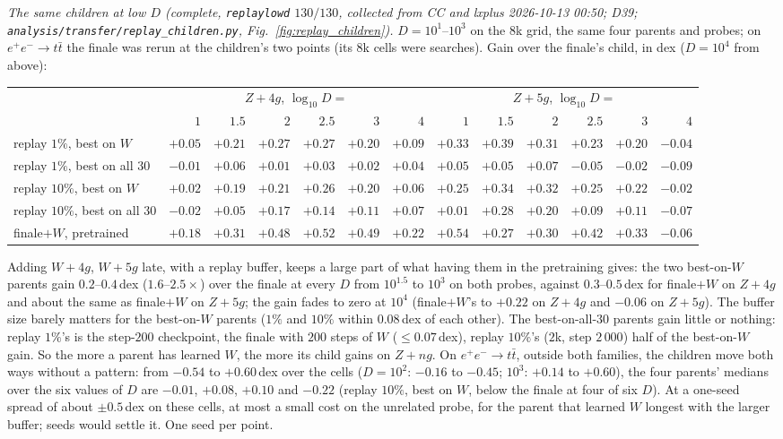 \documentclass[11pt]{article}
\newcommand{\code}[1]{\texttt{#1}}
\begin{document}
\emph{The same children at low $D$ (complete, \code{replaylowd} $130/130$, collected from CC and lxplus 2026-10-13
00:50; D39; \code{analysis/transfer/replay\_children.py}, Fig.~\ref{fig:replay_children}).} $D=10^1$--$10^3$ on the $8$k
grid, the same four parents and probes; on $e^+e^-\to t\bar t$ the finale was rerun at the children's two points (its $8$k
cells were searches). Gain over the finale's child, in dex ($D=10^4$ from above):
\begin{center}\small
\begin{tabular}{l rrrrrr rrrrrr}
 & \multicolumn{6}{c}{$Z+4g$, $\log_{10}D=$} & \multicolumn{6}{c}{$Z+5g$, $\log_{10}D=$} \\
 & $1$ & $1.5$ & $2$ & $2.5$ & $3$ & $4$ & $1$ & $1.5$ & $2$ & $2.5$ & $3$ & $4$ \\ \hline
replay $1\%$, best on $W$     & $+0.05$ & $+0.21$ & $+0.27$ & $+0.27$ & $+0.20$ & $+0.09$ & $+0.33$ & $+0.39$ & $+0.31$ & $+0.23$ & $+0.20$ & $-0.04$ \\
replay $1\%$, best on all $30$ & $-0.01$ & $+0.06$ & $+0.01$ & $+0.03$ & $+0.02$ & $+0.04$ & $+0.05$ & $+0.05$ & $+0.07$ & $-0.05$ & $-0.02$ & $-0.09$ \\
replay $10\%$, best on $W$    & $+0.02$ & $+0.19$ & $+0.21$ & $+0.26$ & $+0.20$ & $+0.06$ & $+0.25$ & $+0.34$ & $+0.32$ & $+0.25$ & $+0.22$ & $-0.02$ \\
replay $10\%$, best on all $30$ & $-0.02$ & $+0.05$ & $+0.17$ & $+0.14$ & $+0.11$ & $+0.07$ & $+0.01$ & $+0.28$ & $+0.20$ & $+0.09$ & $+0.11$ & $-0.07$ \\ \hline
finale$+W$, pretrained        & $+0.18$ & $+0.31$ & $+0.48$ & $+0.52$ & $+0.49$ & $+0.22$ & $+0.54$ & $+0.27$ & $+0.30$ & $+0.42$ & $+0.33$ & $-0.06$ \\
\end{tabular}
\end{center}
Adding $W+4g$, $W+5g$ late, with a replay buffer, keeps a large part of what having them in the pretraining gives: the
two best-on-$W$ parents gain $0.2$--$0.4$\,dex ($1.6$--$2.5\times$) over the finale at every $D$ from $10^{1.5}$ to
$10^3$ on both probes, against $0.3$--$0.5$\,dex for finale$+W$ on $Z+4g$ and about the same as finale$+W$ on $Z+5g$; the
gain fades to zero at $10^4$ (finale$+W$'s to $+0.22$ on $Z+4g$ and $-0.06$ on $Z+5g$). The buffer size barely matters for
the best-on-$W$ parents ($1\%$ and $10\%$ within $0.08$\,dex of each other). The best-on-all-$30$ parents gain little or nothing: replay $1\%$'s is the step-$200$
checkpoint, the finale with $200$ steps of $W$ ($\le0.07$\,dex), replay $10\%$'s ($2$k, step $2\,000$) half of the
best-on-$W$ gain. So the more a parent has learned $W$, the more its child gains on $Z+ng$. On $e^+e^-\to t\bar t$, outside
both families, the children move both ways without a pattern: from $-0.54$ to $+0.60$\,dex over the cells
($D=10^2$: $-0.16$ to $-0.45$; $10^3$: $+0.14$ to $+0.60$), the four parents' medians over the six values of $D$ are $-0.01$, $+0.08$,
$+0.10$ and $-0.22$ (replay $10\%$, best on $W$, below the finale at four of six $D$). At a one-seed spread of about
$\pm0.5$\,dex on these cells, at most a small cost on the unrelated probe, for the parent that learned $W$ longest
with the larger buffer; seeds would settle it. One seed per point.
\end{document}
